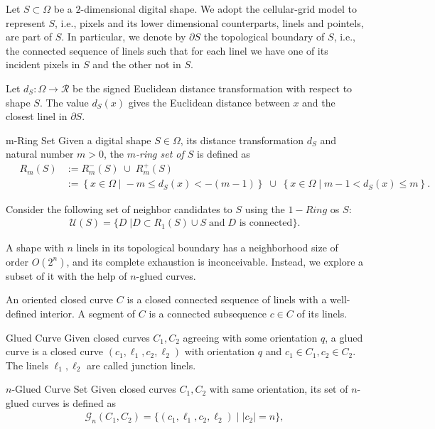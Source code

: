Let $S \subset \Omega$ be a $2$-dimensional digital shape. We adopt the cellular-grid model to represent $S$, i.e., pixels and its lower dimensional counterparts, linels and pointels, are part of $S$. In particular, we denote by $\partial S$ the topological boundary of $S$, i.e., the connected sequence of linels such that for each linel we have one of its incident pixels in $S$ and the other not in $S$.


Let $d_{S}:\Omega \rightarrow \mathcal{R}$ be the signed Euclidean distance transformation with respect to shape $S$. The value $d_S(x)$ gives the Euclidean distance between $x$ and the closest linel in $\partial S$. 

\begin{definition}{m-Ring Set}
Given a digital shape $S\in\Omega$, its distance transformation $d_S$ and natural number $m > 0$, the {\em $m$-ring set of $S$} is defined as
\begin{align*}
	\quad R_m(S) &:= R_m^-(S) \; \cup \; R_m^+(S) \\
	&:= \left\{ x \in \Omega \; | \; -m \leq d_S(x) < -(m-1) \right\} \; \cup \;  \left\{ x \in \Omega \; | \; 	m-1 < d_{S}(x) \leq m \right\}.
\end{align*}
\end{definition}

Consider the following set of neighbor candidates to $S$ using the $1-Ring$ os $S$:
\begin{align*}
\mathcal{U}(S) = \{ D \; | D \subset R_1(S) \cup S \; \text{and} \; \text{$D$ is connected} \}.
\end{align*}


A shape with $n$ linels in its topological boundary has a neighborhood size of order $O(2^n)$, and its complete exhaustion is inconceivable.  Instead, we explore a subset of it with the help of $n$-glued curves.

An oriented closed curve $C$ is a closed connected sequence of linels with a well-defined interior. A segment of $C$ is a connected subsequence $c \in C$ of its linels.


\begin{definition}{Glued Curve}
Given closed curves $C_1,C_2$ agreeing with some orientation $q$, a glued curve is a closed curve  $(c_1,\ell_1,c_2,\ell_2)$ with orientation $q$ and $c_1 \in C_1, c_2 \in C_2$. The linels $\ell_1,\ell_2$ are called junction linels.
\end{definition}

\begin{definition}{$n$-Glued Curve Set}
Given closed curves $C_1,C_2$ with same orientation, its set of $n$-glued curves is defined as
\begin{align*}
	\mathcal{G}_n(C_1,C_2) = \{ (c_1,\ell_1,c_2,\ell_2) \; | \; |c_2|=n \},
\end{align*}
\end{definition}

